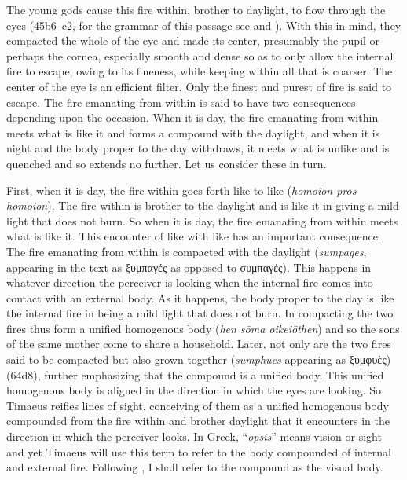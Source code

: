 The young gods cause this fire within, brother to daylight, to flow through the eyes (45b6--c2, for the grammar of this passage see \citealt[63 123--127]{Cook-Wilson:1889cs} and \citealt[277]{Taylor:1928qb}). With this in mind, they compacted the whole of the eye and made its center, presumably the pupil or perhaps the cornea, especially smooth and dense so as to only allow the internal fire to escape, owing to its fineness, while keeping within all that is coarser. The center of the eye is an efficient filter. Only the finest and purest of fire is said to escape. The fire emanating from within is said to have two consequences depending upon the occasion. When it is day, the fire emanating from within meets what is like it and forms a compound with the daylight, and when it is night and the body proper to the day withdraws, it meets what is unlike and is quenched and so extends no further. Let us consider these in turn.

First, when it is day, the fire within goes forth like to like (\emph{homoion pros homoion}). The fire within is brother to the daylight and is like it in giving a mild light that does not burn. So when it is day, the fire emanating from within meets what is like it. This encounter of like with like has an important consequence. The fire emanating from within is compacted with the daylight (\emph{sumpages}, appearing in the text as {\sbl ξυμπαγές} as opposed to {\sbl συμπαγές}). This happens in whatever direction the perceiver is looking when the internal fire comes into contact with an external body. As it happens, the body proper to the day is like the internal fire in being a mild light that does not burn. In compacting the two fires thus form a unified homogenous body (\emph{hen sōma oikeiōthen}) and so the sons of the same mother come to share a household. Later, not only are the two fires said to be compacted but also grown together (\emph{sumphues} appearing as {\sbl ξυμφυὲς}) (64d8), further emphasizing that the compound is a unified body. This unified homogenous body is aligned in the direction in which the eyes are looking. So Timaeus reifies lines of sight, conceiving of them as a unified homogenous body compounded from the fire within and brother daylight that it encounters in the direction in which the perceiver looks. In Greek, ``\emph{opsis}'' means vision or sight and yet Timaeus will use this term to refer to the body compounded of internal and external fire. Following \citet[221]{Ierodiakonou:2005ly}, I shall refer to the compound as the visual body.

